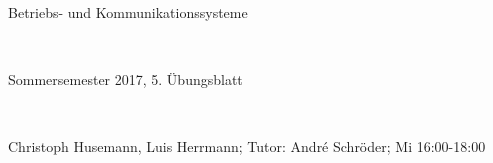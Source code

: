 \documentclass[numbers=noendperiod]{scrartcl}
\begin{document}
	
	\newcommand{\inputmintedframed}[2]{
		\begin{mdframed}[linecolor=bg,backgroundcolor=bg]
			\inputminted[mathescape,breaklines,linenos,numbersep=5pt,tabsize=3]{#1}{#2}
	\end{mdframed}}
	
	\hrulefill
	\begin{center}
		\bfseries %
		\sffamily %
		\begin{huge}
			Betriebs- und Kommunikationssysteme
		\end{huge}\\
		\begin{Large}
			Sommersemester 2017, 5. Übungsblatt
		\end{Large}\\
		\begin{small}
			Christoph Husemann, Luis Herrmann; Tutor: André Schröder; Mi 16:00-18:00
		\end{small}
		
		\vspace{-10pt}
	\end{center}
	\hrulefill
	
\end{document}
